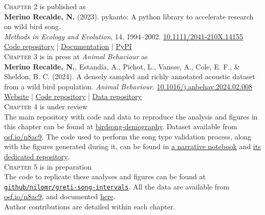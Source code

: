 
\vspace*{2cm}

\noindent \textsc{Chapter 2} is published as\\[.1cm]

\noindent \textbf{Merino Recalde, N.} (2023). pykanto: A python library to accelerate research on wild bird song.\\\textit{Methods in Ecology and Evolution}, 14, 1994--2002. \href{https://doi.org/10.1111/2041-210X.14155}{10.1111/2041-210X.14155}\\[.2cm]
\href{https://github.com/nilomr/pykanto}{Code repository} |  \href{https://nilomr.github.io/pykanto/_build/html/index.html}{Documentation} | \href{https://pypi.org/project/pykanto/}{PyPI}\\[.5cm]

\noindent \textsc{Chapter 3} is in press at \textit{Animal Behaviour} as\\[.1cm]

\noindent \textbf{Merino Recalde, N.}, Estandía, A., Pichot, L., Vansse, A., Cole, E. F., \& Sheldon, B. C. (2024). A densely sampled and richly annotated acoustic dataset from a wild bird population. \textit{Animal Behaviour}. \href{https://doi.org/10.1016/j.anbehav.2024.02.008}{10.1016/j.anbehav.2024.02.008}\\[.2cm]
\href{https://nilomr.github.io/great-tit-hits}{Website} | \href{https://github.com/nilomr/great-tit-hits-setup}{Code repository} | \href{https://osf.io/n8ac9/}{Data repository}\\[.5cm]

\noindent \textsc{Chapter 4} is under review \\[.1cm]

\noindent The main repository with code and data to reproduce the analysis and figures in this chapter can be found at \href{http://github.com/nilomr/birdsong-demography}{birdsong-demography}. Dataset available from \href{https://osf.io/n8ac9}{osf.io/n8ac9}. The code used to perform the song type validation process, along with the figures generated during it, can be found in \href{https://github.com/nilomr/wytham-songtype-validation/blob/main/notebooks/4_train-model.ipynb}{a narrative notebook} and \href{https://github.com/nilomr/wytham-songtype-validation}{its dedicated repository}.\\[.5cm]

\noindent \textsc{Chapter 5} is in preparation \\[.1cm]

\noindent The code to replicate these analyses and figures can be found at \href{https://github.com/nilomr/greti-song-intervals}{\nolinkurl{github/nilomr/greti-song-intervals}}. All the data are available from \href{https://osf.io/n8ac9}{osf.io/n8ac9}, and documented \href{https://nilomr.github.io/great-tit-hits/}{here}.\\[.7cm]

\noindent Author contributions are detailed within each chapter.\\[.5cm]